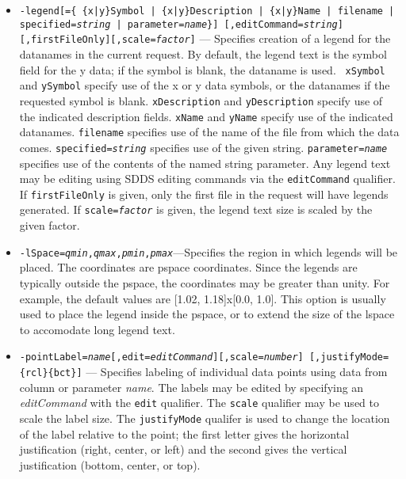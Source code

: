 \begin{itemize}
\begin{itemize}
\begin{itemize}
  \item {\tt -legend[=\{ \{x|y\}Symbol | \{x|y\}Description | \{x|y\}Name | filename | 
 specified={\em string} | parameter={\em name}\}] [,editCommand={\em string}]
  [,firstFileOnly][,scale={\em factor}]} \rm
--- Specifies creation of a legend for the datanames in the current request.  By default, the
legend text is the symbol field for the y data; if the symbol is blank, the dataname is used.  {\tt
xSymbol} and {\tt ySymbol} specify use of the x or y data symbols, or the datanames if the requested
symbol is blank.  {\tt xDescription} and {\tt yDescription} specify use of the indicated description
fields.  {\tt xName} and {\tt yName} specify use of the indicated datanames.  {\tt filename}
specifies use of the name of the file from which the data comes.  {\tt specified={\em string}}
specifies use of the given string.  {\tt parameter={\em name}} specifies use of the contents of the
named string parameter.  Any legend text may be editing using SDDS editing commands via the {\tt editCommand} qualifier.  If {\tt firstFileOnly} is given, only the first file
in the request will have legends generated.  If {\tt scale={\em factor}} is given, the legend text
size is scaled by the given factor.

  \item {\tt -lSpace={\em qmin},{\em qmax},{\em pmin},{\em pmax}}---Specifies the region in which
legends will be placed.  The coordinates are pspace coordinates.  Since the legends are typically
outside the pspace, the coordinates may be greater than unity.  For example, the default values are
[1.02, 1.18]x[0.0, 1.0].  This option is usually used to place the legend inside the pspace, or to
extend the size of the lspace to accomodate long legend text.

  \item {\tt -pointLabel={\em name}[,edit={\em editCommand}][,scale={\em number}]
        [,justifyMode=\{rcl\}\{bct\}]} --- Specifies labeling of individual data points using
        data from column or parameter {\em name}.  The labels may be edited by specifying an
        {\em editCommand} with the {\tt edit} qualifier.  The {\tt scale} qualifier may be
        used to scale the label size.  The {\tt justifyMode} qualifer is used to change the
        location of the label relative to the point; the first letter gives the horizontal
        justification (right, center, or left) and the second gives the vertical
        justification (bottom, center, or top).
        

\end{itemize}
\end{itemize}
\end{itemize}
